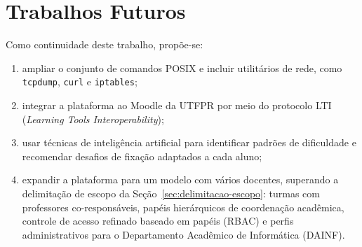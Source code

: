 \section{Trabalhos Futuros}
\label{sec:trabalhos-futuros}
Como continuidade deste trabalho, propõe-se:
\begin{enumerate}
    \item ampliar o conjunto de comandos POSIX e incluir utilitários de rede, como \texttt{tcpdump}, \texttt{curl} e \texttt{iptables};
    \item integrar a plataforma ao Moodle da UTFPR por meio do protocolo LTI (\textit{Learning Tools Interoperability});
    \item usar técnicas de inteligência artificial para identificar padrões de dificuldade e recomendar desafios de fixação adaptados a cada aluno;
    \item expandir a plataforma para um modelo com vários docentes, superando a delimitação de escopo da Seção~\ref{sec:delimitacao-escopo}: turmas com professores co-responsáveis, papéis hierárquicos de coordenação acadêmica, controle de acesso refinado baseado em papéis (RBAC) e perfis administrativos para o Departamento Acadêmico de Informática (DAINF).
\end{enumerate}
